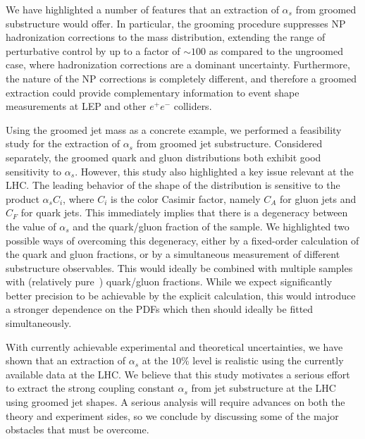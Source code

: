\documentclass[11pt]{cernrep}
\begin{document}
We have highlighted a number of features that an extraction of $\alpha_s$ from groomed substructure would offer.
%
In particular, the grooming procedure suppresses NP hadronization corrections to the mass distribution, extending the range of perturbative control by up to a factor of $\sim 100$ as compared to the ungroomed case, where hadronization corrections are a dominant uncertainty.
%
Furthermore, the nature of the NP corrections is completely different, and therefore a groomed extraction could provide complementary information to event shape measurements at LEP and other $e^+e^-$ colliders. 

Using the groomed jet mass as a concrete example, we performed a feasibility study for the extraction of $\alpha_s$ from groomed jet substructure.
%
Considered separately, the groomed quark and gluon distributions both exhibit good sensitivity to $\alpha_s$.
%
However, this study also highlighted a key issue relevant at the LHC.
%
The leading behavior of the shape of the distribution is sensitive to the product $\alpha_s C_i$, where $C_i$ is the color Casimir factor, namely $C_A$ for gluon jets and $C_F$ for quark jets.
%
This immediately implies that there is a degeneracy between the value of $\alpha_s$ and the quark/gluon fraction of the sample.
%
We highlighted two possible ways of overcoming this degeneracy, either by a fixed-order calculation of the quark and gluon fractions, or by a simultaneous measurement of different substructure observables.
%
This would ideally be combined with multiple samples with (relatively pure~\cite{Gallicchio:2011xc}) quark/gluon fractions.
%
While we expect significantly better precision to be achievable by the explicit calculation, this would introduce a stronger dependence on the PDFs which then should ideally be fitted simultaneously.

With currently achievable experimental and theoretical uncertainties, we have shown that an extraction of $\alpha_s$ at the $10\%$ level is realistic using the currently available data at the LHC.
%
We believe that this study motivates a serious effort to extract the strong coupling constant $\alpha_s$ from jet substructure at the LHC using groomed jet shapes.
%
A serious analysis will require advances on both the theory and experiment sides, so we conclude by discussing some of the major obstacles that must be overcome.
\end{document}
